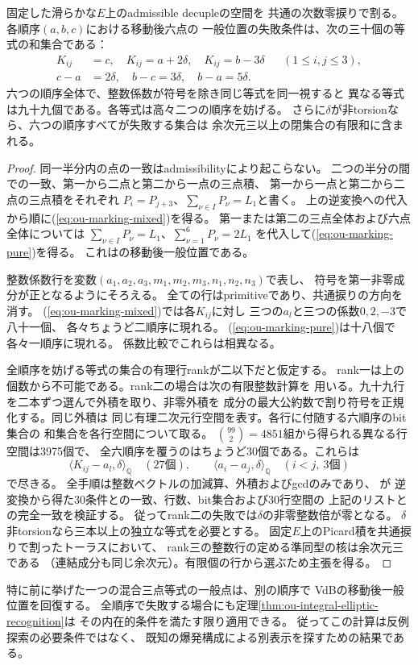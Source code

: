 \begin{proposition}\label{prop:ou-marking-walls}
固定した滑らかな$E$上のadmissible decupleの空間を
共通の次数零捩りで割る。各順序$(a,b,c)$における移動後六点の
一般位置の失敗条件は、次の三十個の等式の和集合である：
\begin{align}
 K_{ij}&=c,\quad K_{ij}=a+2\delta,\quad K_{ij}=b-3\delta
       &&(1\le i,j\le3),\label{eq:ou-marking-mixed}\\
 c-a&=2\delta,\quad b-c=3\delta,\quad b-a=5\delta .
       \label{eq:ou-marking-pure}
\end{align}
六つの順序全体で、整数係数が符号を除き同じ等式を同一視すると
異なる等式は九十九個である。各等式は高々二つの順序を妨げる。
さらに$\delta$が非torsionなら、六つの順序すべてが失敗する集合は
余次元三以上の閉集合の有限和に含まれる。
\end{proposition}
\begin{proof}
同一半分内の点の一致はadmissibilityにより起こらない。
二つの半分の間での一致、第一から二点と第二から一点の三点積、
第一から一点と第二から二点の三点積をそれぞれ
$P_i=P_{j+3}$、$\sum_{\nu\in I}P_\nu=L_1$と書く。
上の逆変換への代入から順に(\ref{eq:ou-marking-mixed})を得る。
第一または第二の三点全体および六点全体については
$\sum_{\nu\in I}P_\nu=L_1$、$\sum_{\nu=1}^6 P_\nu=2L_1$
を代入して(\ref{eq:ou-marking-pure})を得る。
これは\cite[Definition~11.1.2]{VdBBlowup2001}の移動後一般位置である。

整数係数行を変数$(a_1,a_2,a_3,m_1,m_2,m_3,n_1,n_2,n_3)$で表し、
符号を第一非零成分が正となるようにそろえる。
全ての行はprimitiveであり、共通捩りの方向を消す。
(\ref{eq:ou-marking-mixed})では各$K_{ij}$に対し
三つの$a_l$と三つの係数$0,2,-3$で八十一個、
各々ちょうど二順序に現れる。
(\ref{eq:ou-marking-pure})は十八個で各々一順序に現れる。
係数比較でこれらは相異なる。

全順序を妨げる等式の集合の有理行rankが二以下だと仮定する。
rank一は上の個数から不可能である。rank二の場合は次の有限整数計算を
用いる。九十九行を二本ずつ選んで外積を取り、非零外積を
成分の最大公約数で割り符号を正規化する。同じ外積は
同じ有理二次元行空間を表す。各行に付随する六順序のbit集合の
和集合を各行空間について取る。
$\binom{99}{2}=4851$組から得られる異なる行空間は3975個で、
全六順序を覆うのはちょうど30個である。これらは
\[
 \langle K_{ij}-a_l,\delta\rangle_{\mathbb Q}
       \quad(27\text{個}),\qquad
 \langle a_i-a_j,\delta\rangle_{\mathbb Q}\quad(i<j,\ 3\text{個})
\]
で尽きる。
全手順は整数ベクトルの加減算、外積およびgcdのみであり、
が
逆変換から得た30条件との一致、行数、bit集合および30行空間の
上記のリストとの完全一致を検証する。
従ってrank二の失敗では$\delta$の非零整数倍が零となる。
$\delta$非torsionなら三本以上の独立な等式を必要とする。
固定$E$上のPicard積を共通捩りで割ったトーラスにおいて、
rank三の整数行の定める準同型の核は余次元三である
（連結成分も同じ余次元）。有限個の行から選ぶため主張を得る。
\end{proof}

\begin{remark}
特に前に挙げた一つの混合三点等式の一般点は、別の順序で
VdBの移動後一般位置を回復する。
全順序で失敗する場合にも定理\ref{thm:ou-integral-elliptic-recognition}は
その内在的条件を満たす限り適用できる。
従ってこの計算は反例探索の必要条件ではなく、
既知の爆発構成による別表示を探すための結果である。
\end{remark}
